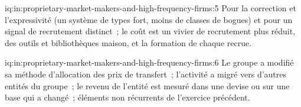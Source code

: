 \begin{solution}{iq:in:proprietary-market-makers-and-high-frequency-firms:5}
Pour la correction et l'expressivité (un système de types fort, moins de classes de bogues) et pour un signal de recrutement distinct~; le
coût est un vivier de recrutement plus réduit, des outils et bibliothèques maison, et la formation de chaque recrue.
\end{solution}

\begin{solution}{iq:in:proprietary-market-makers-and-high-frequency-firms:6}
Le groupe a modifié sa méthode d'allocation des prix de transfert~; l'activité a migré vers d'autres entités du groupe~; le revenu de l'entité
est mesuré dans une devise ou sur une base qui a changé~; éléments non récurrents de l'exercice précédent.
\end{solution}
